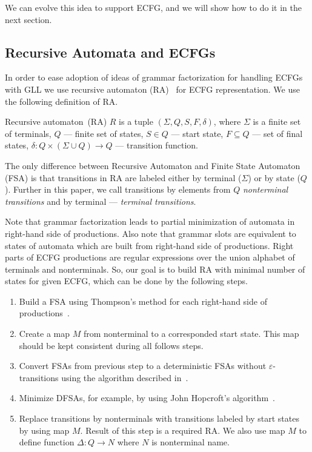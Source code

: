 \documentclass[runningheads,a4paper]{llncs}
\begin{document}
We can evolve this idea to support ECFG, and we will show how to do it in the next section.

\subsection{Recursive Automata and ECFGs}

In order to ease adoption of ideas of grammar factorization for handling ECFGs with GLL we use recursive automaton (RA)~\cite{tellier2006learning} for ECFG representation.
We use the following definition of RA.

\begin{mydef}
    Recursive automaton~(RA) $R$ is a tuple $(\Sigma, Q, S, F, \delta)$, where $\Sigma$ is a finite set of terminals, $Q$ --- finite set of states, $S \in Q$ --- start state, $F \subseteq Q$ --- set of final states, $\delta : Q \times (\Sigma \cup Q) \to Q$ --- transition function.
\end{mydef}

The only difference between Recursive Automaton and Finite State Automaton (FSA) is that transitions in RA are labeled either by terminal ($\Sigma$) or by state ($Q$).
Further in this paper, we call transitions by elements from $Q$ \textit{nonterminal transitions} and by terminal --- \textit{terminal transitions}.

Note that grammar factorization leads to partial minimization of automata in right-hand side of productions.
Also note that grammar slots are equivalent to states of automata which are built from right-hand side of productions.
Right parts of ECFG productions are regular expressions over the union alphabet of terminals and nonterminals.
So, our goal is to build RA with minimal number of states for given ECFG, which can be done by the following steps.
\begin{enumerate} 
\item Build a FSA using Thompson's method for each right-hand side of productions~\cite{Thompson:1968:PTR:363347.363387}.
\item Create a map $M$ from nonterminal to a corresponded start state.
This map should be kept consistent during all follows steps. 
\item Convert FSAs from previous step to a deterministic FSAs without $\varepsilon$-transitions using the algorithm described in~\cite{aho1974design}.
\item Minimize DFSAs, for example, by using John Hopcroft's algorithm~\cite{hopcroft1971n}.
\item Replace transitions by nonterminals with transitions labeled by start states by using map $M$.
Result of this step is a required RA. We also use map $M$ to define function $\Delta : Q \to N$ where $N$ is nonterminal name.
\end{enumerate}
\end{document}
